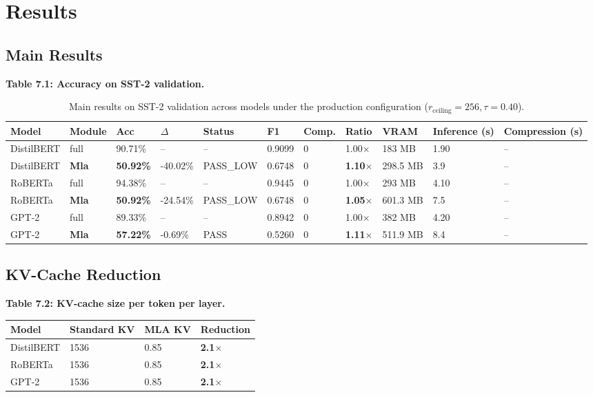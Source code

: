 
\section{Results}

\subsection{Main Results}

\textbf{Table 7.1: Accuracy on SST-2 validation.}

\begin{table}[t]
\centering
\small
\begin{tabular}{lllllllllll}
\toprule
\textbf{Model} & \textbf{Module} & \textbf{Acc} & \textbf{$\Delta$} & \textbf{Status} & \textbf{F1} & \textbf{Comp.} & \textbf{Ratio} & \textbf{VRAM} & \textbf{Inference (s)} & \textbf{Compression (s)} \\
\midrule
DistilBERT & full & 90.71\% & -- & -- & 0.9099 & 0 & 1.00$\times$ & 183 MB & 1.90 & -- \\
DistilBERT & \textbf{Mla} & \textbf{50.92\%} & -40.02\% & PASS\_LOW & 0.6748 & 0 & \textbf{1.10$\times$} & 298.5 MB & 3.9 & -- \\
RoBERTa & full & 94.38\% & -- & -- & 0.9445 & 0 & 1.00$\times$ & 293 MB & 4.10 & -- \\
RoBERTa & \textbf{Mla} & \textbf{50.92\%} & -24.54\% & PASS\_LOW & 0.6748 & 0 & \textbf{1.05$\times$} & 601.3 MB & 7.5 & -- \\
GPT-2 & full & 89.33\% & -- & -- & 0.8942 & 0 & 1.00$\times$ & 382 MB & 4.20 & -- \\
GPT-2 & \textbf{Mla} & \textbf{57.22\%} & -0.69\% & PASS & 0.5260 & 0 & \textbf{1.11$\times$} & 511.9 MB & 8.4 & -- \\
\bottomrule
\end{tabular}
\caption{Main results on SST-2 validation across models under the production configuration ($r_{\mathrm{ceiling}}=256, \tau=0.40$).}
\label{tab:main_sst2}
\end{table}

\subsection{KV-Cache Reduction}

\textbf{Table 7.2: KV-cache size per token per layer.}

\begin{table}[H]
\centering
\small
\begin{tabular}{llll}
\toprule
\textbf{Model} & \textbf{Standard KV} & \textbf{MLA KV} & \textbf{Reduction} \\
\midrule
DistilBERT & 1536 & 0.85 & \textbf{2.1$\times$} \\
RoBERTa & 1536 & 0.85 & \textbf{2.1$\times$} \\
GPT-2 & 1536 & 0.85 & \textbf{2.1$\times$} \\
\bottomrule
\end{tabular}
\end{table}

